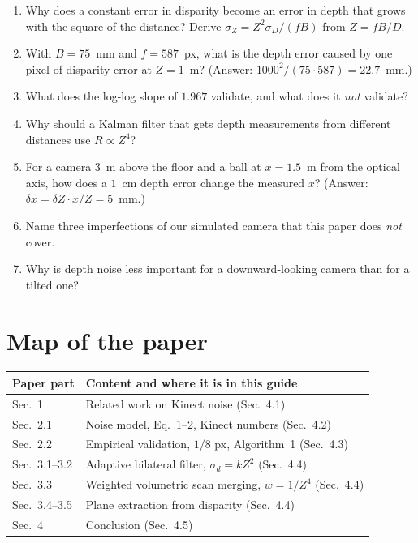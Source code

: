 \documentclass[11pt,a4paper]{article}
\begin{document}
\begin{enumerate}
\item Why does a constant error in disparity become an error in depth that grows with the square
of the distance? Derive $\sigma_Z=Z^2\sigma_D/(fB)$ from $Z=fB/D$.
\item With $B=75$~mm and $f=587$~px, what is the depth error caused by one pixel of disparity error
at $Z=1$~m? (Answer: $1000^2/(75\cdot587)=22.7$~mm.)
\item What does the log-log slope of $1.967$ validate, and what does it \emph{not} validate?
\item Why should a Kalman filter that gets depth measurements from different distances use
$R\propto Z^4$?
\item For a camera 3~m above the floor and a ball at $x=1.5$~m from the optical axis, how does a
$1$~cm depth error change the measured $x$? (Answer: $\delta x=\delta Z\cdot x/Z=5$~mm.)
\item Name three imperfections of our simulated camera that this paper does \emph{not} cover.
\item Why is depth noise less important for a downward-looking camera than for a tilted one?
\end{enumerate}

\appendix
\section{Map of the paper}
\begin{center}
\small
\begin{tabularx}{\textwidth}{@{}l X@{}}
\toprule
Paper part & Content and where it is in this guide \\
\midrule
Sec.~1 & Related work on Kinect noise (Sec.~4.1) \\
Sec.~2.1 & Noise model, Eq.~1--2, Kinect numbers (Sec.~4.2) \\
Sec.~2.2 & Empirical validation, $1/8$ px, Algorithm~1 (Sec.~4.3) \\
Sec.~3.1--3.2 & Adaptive bilateral filter, $\sigma_d=kZ^2$ (Sec.~4.4) \\
Sec.~3.3 & Weighted volumetric scan merging, $w=1/Z^4$ (Sec.~4.4) \\
Sec.~3.4--3.5 & Plane extraction from disparity (Sec.~4.4) \\
Sec.~4 & Conclusion (Sec.~4.5) \\
\bottomrule
\end{tabularx}
\end{center}
\end{document}
